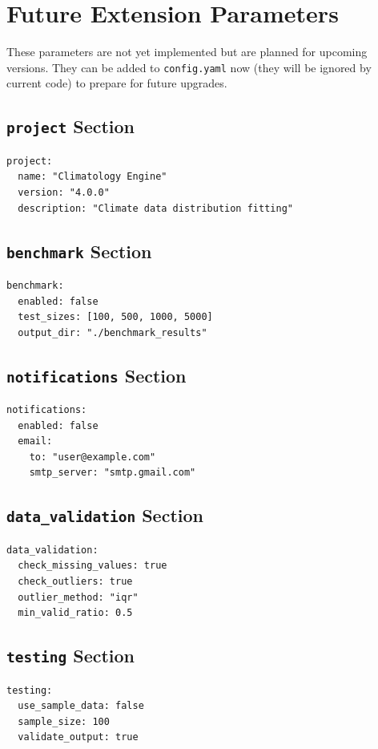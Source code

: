 \documentclass[12pt,a4paper]{article}
\begin{document}
\section{Future Extension Parameters}

These parameters are not yet implemented but are planned for upcoming versions. They can be added to \texttt{config.yaml} now (they will be ignored by current code) to prepare for future upgrades.

\subsection{\texttt{project} Section}
\begin{verbatim}
project:
  name: "Climatology Engine"
  version: "4.0.0"
  description: "Climate data distribution fitting"
\end{verbatim}

\subsection{\texttt{benchmark} Section}
\begin{verbatim}
benchmark:
  enabled: false
  test_sizes: [100, 500, 1000, 5000]
  output_dir: "./benchmark_results"
\end{verbatim}

\subsection{\texttt{notifications} Section}
\begin{verbatim}
notifications:
  enabled: false
  email:
    to: "user@example.com"
    smtp_server: "smtp.gmail.com"
\end{verbatim}

\subsection{\texttt{data\_validation} Section}
\begin{verbatim}
data_validation:
  check_missing_values: true
  check_outliers: true
  outlier_method: "iqr"
  min_valid_ratio: 0.5
\end{verbatim}

\subsection{\texttt{testing} Section}
\begin{verbatim}
testing:
  use_sample_data: false
  sample_size: 100
  validate_output: true
\end{verbatim}
\end{document}
